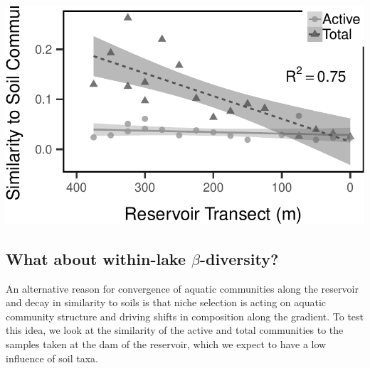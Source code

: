 \documentclass[]{article}
\begin{document}
\begin{center}\includegraphics[width=0.7\linewidth]{ReservoirGradient_files/figure-latex/plot_similarity_to_soils-1} \end{center}

\subsection{\texorpdfstring{What about within-lake
\(\beta\)-diversity?}{What about within-lake \textbackslash{}beta-diversity?}}\label{what-about-within-lake-beta-diversity}

An alternative reason for convergence of aquatic communities along the
reservoir and decay in similarity to soils is that niche selection is
acting on aquatic community structure and driving shifts in composition
along the gradient. To test this idea, we look at the similarity of the
active and total communities to the samples taken at the dam of the
reservoir, which we expect to have a low influence of soil taxa.
\end{document}
